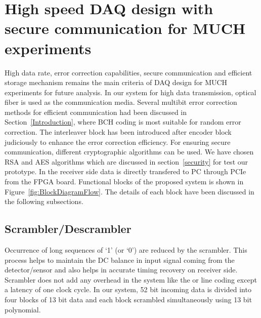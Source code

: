 \documentclass[a4paper]{jpconf}
\begin{document}
\section{High speed DAQ design with secure communication for MUCH experiments}\label{SystemDesignDAQ}
High data rate, error correction capabilities, secure communication and efficient storage mechanism remains the main criteria of DAQ design for MUCH experiments for future analysis. In our system for high data transmission, optical fiber is used as the communication media. Several multibit error correction methods for efficient communication had been discussed in Section~\ref{Introduction}, where BCH coding is most suitable for random error correction. The interleaver block has been introduced after encoder block judiciously to enhance the error correction efficiency. For ensuring secure communication, different cryptographic algorithms can be used. We have chosen RSA and AES algorithms which are discussed in section~\ref{security} for test our prototype. In the receiver side data is directly transfered to PC through PCIe from the FPGA board. Functional blocks of the proposed system is shown in Figure~\ref{fig:BlockDiagramFlow}. The details of each block have been discussed in the following subsections. 

\vspace{-3 pc}
\subsection{Scrambler/Descrambler} Occurrence of long sequences of `1' (or `0') are reduced by the scrambler. This process helps to maintain the DC balance in input signal coming from the detector/sensor and also helps in accurate timing recovery on receiver side. Scrambler does not add any overhead in the system like the  or  line coding except a latency of one clock cycle. In our system, 52 bit incoming data is divided into four blocks of 13 bit data and each block scrambled simultaneously using 13 bit polynomial. 
\vspace{-1 pc}
\end{document}
